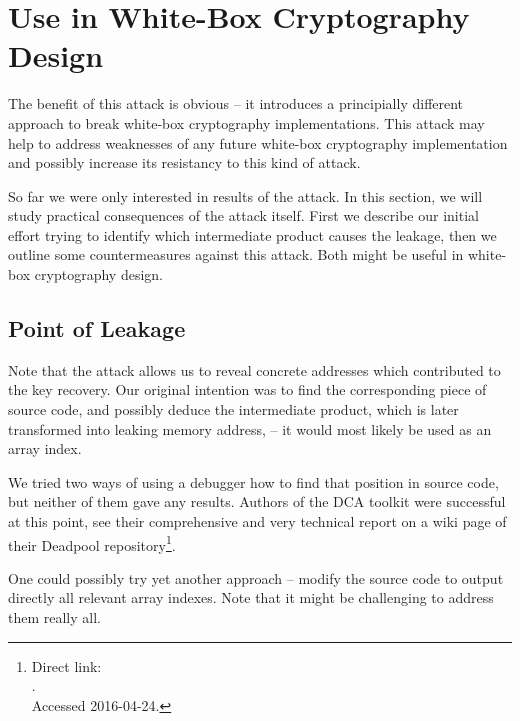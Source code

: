 \section{Use in White-Box Cryptography Design}
\label{sec:useindesign}

The benefit of this attack is obvious -- it introduces a principially different approach to break white-box cryptography implementations. This attack may help to address weaknesses of any future white-box cryptography implementation and possibly increase its resistancy to this kind of attack.

So far we were only interested in results of the attack. In this section, we will study practical consequences of the attack itself. First we describe our initial effort trying to identify which intermediate product causes the leakage, then we outline some countermeasures against this attack. Both might be useful in white-box cryptography design.



\subsection{Point of Leakage}
\label{sec:leakpoint}

Note that the attack allows us to reveal concrete addresses which contributed to the key recovery. Our original intention was to find the corresponding piece of source code, and possibly deduce the intermediate product, which is later transformed into leaking memory address, -- it would most likely be used as an array index.

We tried two ways of using a debugger how to find that position in source code, but neither of them gave any results. Authors of the DCA toolkit \cite{bos2016tools} were successful at this point, see their comprehensive and very technical report on a wiki page of their Deadpool repository\footnote{Direct link:\\.\\Accessed 2016-04-24.}.

One could possibly try yet another approach -- modify the source code to output directly all relevant array indexes. Note that it might be challenging to address them really all.

